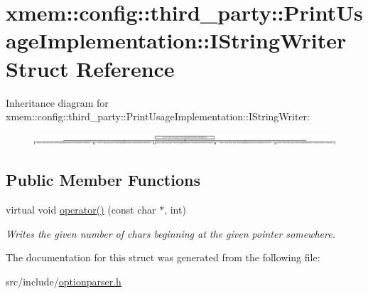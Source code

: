 \hypertarget{structxmem_1_1config_1_1third__party_1_1_print_usage_implementation_1_1_i_string_writer}{\section{xmem\-:\-:config\-:\-:third\-\_\-party\-:\-:Print\-Usage\-Implementation\-:\-:I\-String\-Writer Struct Reference}
\label{structxmem_1_1config_1_1third__party_1_1_print_usage_implementation_1_1_i_string_writer}
}
Inheritance diagram for xmem\-:\-:config\-:\-:third\-\_\-party\-:\-:Print\-Usage\-Implementation\-:\-:I\-String\-Writer\-:\begin{figure}[H]
\begin{center}
\leavevmode
\includegraphics[height=0.440945cm]{structxmem_1_1config_1_1third__party_1_1_print_usage_implementation_1_1_i_string_writer}
\end{center}
\end{figure}
\subsection*{Public Member Functions}
\begin{DoxyCompactItemize}
\item 
\hypertarget{structxmem_1_1config_1_1third__party_1_1_print_usage_implementation_1_1_i_string_writer_aa391efef2dec3e18d614afb7e093a034}{virtual void \hyperlink{structxmem_1_1config_1_1third__party_1_1_print_usage_implementation_1_1_i_string_writer_aa391efef2dec3e18d614afb7e093a034}{operator()} (const char $\ast$, int)}\label{structxmem_1_1config_1_1third__party_1_1_print_usage_implementation_1_1_i_string_writer_aa391efef2dec3e18d614afb7e093a034}

\begin{DoxyCompactList}\small\item\em Writes the given number of chars beginning at the given pointer somewhere. \end{DoxyCompactList}\end{DoxyCompactItemize}


The documentation for this struct was generated from the following file\-:\begin{DoxyCompactItemize}
\item 
src/include/\hyperlink{optionparser_8h}{optionparser.\-h}\end{DoxyCompactItemize}
